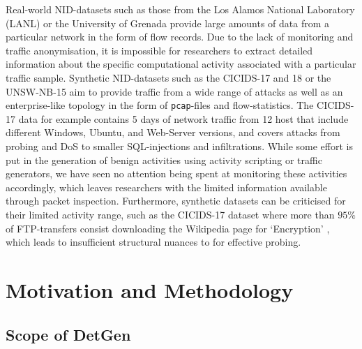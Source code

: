 \documentclass[runningheads]{llncs}
\begin{document}
Real-world NID-datasets such as those from the Los Alamos National Laboratory \cite{kent-2015-cyberdata1} (LANL) or the University of Grenada \cite{macia2018ugr} provide large amounts of data from a particular network in the form of flow records. Due to the lack of monitoring and traffic anonymisation, it is impossible for researchers to extract detailed information about the specific computational activity associated with a particular traffic sample.
Synthetic NID-datasets such as the CICIDS-17 and 18 \cite{sharafaldin2018toward} or the UNSW-NB-15 \cite{moustafa2015unsw} aim to provide traffic from a wide range of attacks as well as an enterprise-like topology in the form of \texttt{pcap}-files and flow-statistics. The CICIDS-17 data for example contains 5 days of network traffic from 12 host that include different Windows, Ubuntu, and Web-Server versions, and covers attacks from probing and DoS to smaller SQL-injections and infiltrations.
While some effort is put in the generation of benign activities using activity scripting or traffic generators, we have seen no attention being spent at monitoring these activities accordingly, which leaves researchers with the limited information available through packet inspection. Furthermore, synthetic datasets can be criticised for their limited activity range, such as the CICIDS-17 dataset where more than $95\%$ of FTP-transfers consist downloading the Wikipedia page for ‘Encryption’ \cite{ring2019survey}, which leads to insufficient structural nuances to for effective probing.


\section{Motivation and Methodology}\label{Sec:Motivation}




\subsection{Scope of DetGen}
\label{Sec:Improvedtrafficsep}
\end{document}
